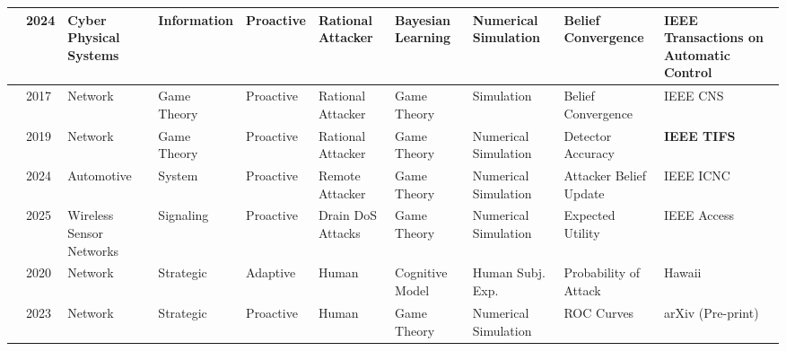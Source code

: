 \begin{landscape}
\begin{longtable}{|p{0.6cm}|p{0.8cm}|p{2.6cm}|p{2.2cm}|p{2.8cm}|p{2.5cm}|p{2cm}|p{2.5cm}|p{2.8cm}|p{3.8cm}|}
            \cite{asymptoticbayesian2023} & 2024          & Cyber Physical Systems   & Information         & Proactive                     & Rational Attacker           & Bayesian Learning       & Numerical Simulation       & Belief Convergence                                               & IEEE Transactions on Automatic Control \\ \hline
            \cite{quantdeception2017}     & 2017          & Network                  & Game Theory         & Proactive                     & Rational Attacker           & Game Theory             & Simulation                 & Belief Convergence                                               & IEEE CNS                               \\ \hline
            \cite{leakydeception2018}     & 2019          & Network                  & Game Theory         & Proactive                     & Rational Attacker           & Game Theory             & Numerical Simulation       & Detector Accuracy                                                & \textbf{IEEE TIFS}                     \\ \hline
            \cite{bayesautodeception2024} & 2024          & Automotive               & System              & Proactive                     & Remote Attacker             & Game Theory             & Numerical Simulation       & Attacker Belief Update                                           & IEEE ICNC                              \\ \hline
            \cite{batterydeception2024}   & 2025          & Wireless Sensor Networks & Signaling           & Proactive                     & Drain DoS Attacks           & Game Theory             & Numerical Simulation       & Expected Utility                                                 & IEEE Access                            \\ \hline
            \cite{adaptivecognitive2020}  & 2020          & Network                  & Strategic           & Adaptive                      & Human                       & Cognitive Model         & Human Subj. Exp.           & Probability of Attack                                            & Hawaii                                 \\ \hline
            \cite{gameoftravesty2023}     & 2023          & Network                  & Strategic           & Proactive                     & Human                       & Game Theory             & Numerical Simulation       & ROC Curves                                                       & arXiv (Pre-print)                      \\ \hline

\end{longtable}
\end{landscape}
